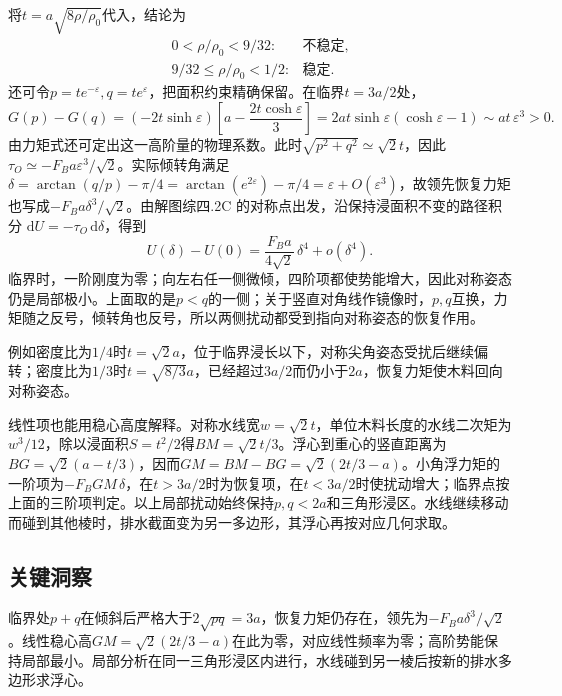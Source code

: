 \documentclass[UTF8,fontset=fandol,a4paper,11pt]{ctexart}
\begin{document}
将$t=a\sqrt{8\rho/\rho_0}$代入，结论为
\[
\boxed{\begin{array}{ll}
0<\rho/\rho_0<9/32:&\text{不稳定},\\
9/32\le\rho/\rho_0<1/2:&\text{稳定}.
\end{array}}
\]
还可令$p=t e^{-\varepsilon},q=t e^\varepsilon$，把面积约束精确保留。在临界$t=3a/2$处，
\[
G(p)-G(q)
=(-2t\sinh\varepsilon)
\left[a-\frac{2t\cosh\varepsilon}{3}\right]
=2at\sinh\varepsilon(\cosh\varepsilon-1)
\sim at\,\varepsilon^3>0.
\]
由力矩式还可定出这一高阶量的物理系数。此时$\sqrt{p^2+q^2}\simeq\sqrt2t$，因此$\tau_O\simeq-F_Ba\varepsilon^3/\sqrt2$。实际倾转角满足$\delta=\arctan(q/p)-\pi/4=\arctan(e^{2\varepsilon})-\pi/4=\varepsilon+O(\varepsilon^3)$，故领先恢复力矩也写成$-F_Ba\delta^3/\sqrt2$。由解图综四.2C 的对称点出发，沿保持浸面积不变的路径积分 $\mathrm dU=-\tau_O\,\mathrm d\delta$，得到
\[
U(\delta)-U(0)=\frac{F_Ba}{4\sqrt2}\,\delta^4+o(\delta^4).
\]
临界时，一阶刚度为零；向左右任一侧微倾，四阶项都使势能增大，因此对称姿态仍是局部极小。上面取的是$p<q$的一侧；关于竖直对角线作镜像时，$p,q$互换，力矩随之反号，倾转角也反号，所以两侧扰动都受到指向对称姿态的恢复作用。

例如密度比为$1/4$时$t=\sqrt2a$，位于临界浸长以下，对称尖角姿态受扰后继续偏转；密度比为$1/3$时$t=\sqrt{8/3}a$，已经超过$3a/2$而仍小于$2a$，恢复力矩使木料回向对称姿态。

线性项也能用稳心高度解释。对称水线宽$w=\sqrt2t$，单位木料长度的水线二次矩为$w^3/12$，除以浸面积$S=t^2/2$得$BM=\sqrt2t/3$。浮心到重心的竖直距离为$BG=\sqrt2(a-t/3)$，因而$GM=BM-BG=\sqrt2(2t/3-a)$。小角浮力矩的一阶项为$-F_BGM\,\delta$，在$t>3a/2$时为恢复项，在$t<3a/2$时使扰动增大；临界点按上面的三阶项判定。以上局部扰动始终保持$p,q<2a$和三角形浸区。水线继续移动而碰到其他棱时，排水截面变为另一多边形，其浮心再按对应几何求取。




\subsection*{关键洞察}

临界处$p+q$在倾斜后严格大于$2\sqrt{pq}=3a$，恢复力矩仍存在，领先为$-F_Ba\delta^3/\sqrt2$。线性稳心高$GM=\sqrt2(2t/3-a)$在此为零，对应线性频率为零；高阶势能保持局部最小。局部分析在同一三角形浸区内进行，水线碰到另一棱后按新的排水多边形求浮心。


\end{document}
